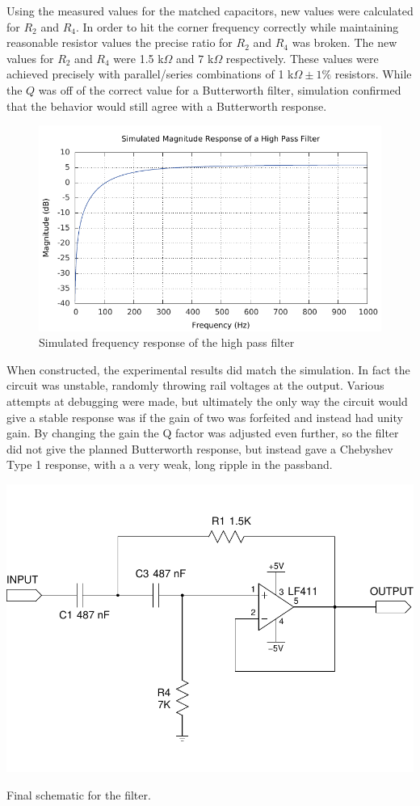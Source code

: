 \documentclass[justified]{tufte-handout}
\begin{document}
Using the measured values for the matched capacitors, new values were calculated
for $R_2$ and $R_4$. In order to hit the corner frequency correctly while
maintaining reasonable resistor values the precise ratio for $R_2$ and $R_4$ was
broken. The new values for $R_2$ and $R_4$ were 1.5 k$\Omega$ and $7$ k$\Omega$
respectively. These values were achieved precisely with parallel/series
combinations of 1 k$\Omega \pm 1\%$ resistors. While the $Q$ was off of the
correct value for a Butterworth filter, simulation confirmed that the behavior
would still agree with a Butterworth response.
\begin{figure}
\centering
\label{simRes}
\includegraphics[width=0.9\linewidth]{simResponse.pdf}
\caption{Simulated frequency response of the high pass filter}
\end{figure}
When constructed, the experimental results did match the simulation. In fact the
circuit was unstable, randomly throwing rail voltages at the output. Various
attempts at debugging were made, but ultimately the only way the circuit would
give a stable response was if the gain of two was forfeited and instead had
unity gain. By changing the gain the Q factor was adjusted even further, so the
filter did not give the planned Butterworth response, but instead gave a
Chebyshev Type 1 response, with a a very weak, long ripple in the passband.
\begin{marginfigure}
\centering
\label{schemExp}
\includegraphics[width=1.1\linewidth,trim=0 .3in 0 .35in,clip=true]
{schemExp.pdf}
\caption{Final schematic for the filter.}
\end{marginfigure}
\clearpage
\end{document}

